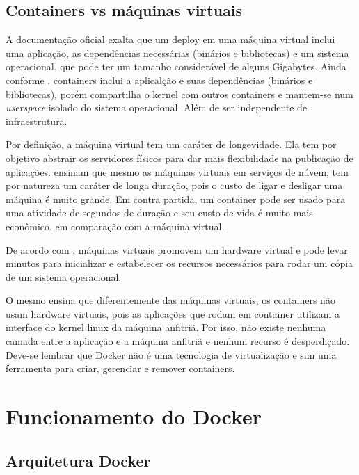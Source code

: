 \documentclass[
	12pt,				%
	openright,			%
	oneside,			%
	a4paper,			%
	chapter=TITLE,		%
	section=TITLE,		%
	english,			%
	french,				%
	spanish,			%
	brazil				%
	]{abntex2}
\begin{document}
\subsection{Containers vs máquinas virtuais}

A documentação oficial exalta que um deploy em uma máquina virtual inclui uma aplicação, as dependências necessárias (binários e bibliotecas) e um sistema operacional, que pode ter um tamanho considerável de alguns Gigabytes. Ainda conforme , containers inclui a aplicalção e suas dependências (binários e bibliotecas), porém compartilha o kernel com outros containers e mantem-se num \textit{userspace} isolado do sistema operacional. Além de ser independente de infraestrutura.

Por definição, a máquina virtual tem um caráter de longevidade. Ela tem por objetivo abstrair os servidores físicos para dar mais flexibilidade na publicação de aplicações.  ensinam que mesmo as máquinas virtuais em serviços de núvem, tem por natureza um caráter de longa duração, pois o custo de ligar e desligar uma máquina é muito grande. Em contra partida, um container pode ser usado para uma atividade de segundos de duração e seu custo de vida é muito mais econômico, em comparação com a máquina virtual.

De acordo com , máquinas virtuais promovem um hardware virtual e pode levar minutos para inicializar e estabelecer os recursos necessários para rodar um cópia de um sistema operacional.

O mesmo  ensina que diferentemente das máquinas virtuais, os containers não usam hardware virtuais, pois as aplicações que rodam em container utilizam a interface do kernel linux da máquina anfitriã. Por isso, não existe nenhuma camada entre a aplicação e a máquina anfitriã e nenhum recurso é desperdiçado. Deve-se lembrar que Docker não é uma tecnologia de virtualização e sim uma ferramenta para criar, gerenciar e remover containers.

\section{Funcionamento do Docker}

\subsection{Arquitetura Docker}
\end{document}
